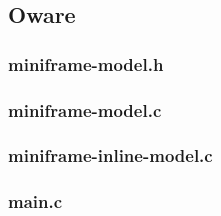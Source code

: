\begin{scriptsize}
\begin{ttfamily}

\end{ttfamily}
\end{scriptsize}

\subsection{Oware}

\subsubsection{miniframe-model.h}

\begin{scriptsize}
\begin{ttfamily}

\end{ttfamily}
\end{scriptsize}

\subsubsection{miniframe-model.c}

\begin{scriptsize}
\begin{ttfamily}

\end{ttfamily}
\end{scriptsize}

\subsubsection{miniframe-inline-model.c}

\begin{scriptsize}
\begin{ttfamily}

\end{ttfamily}
\end{scriptsize}

\subsubsection{main.c}

\begin{scriptsize}
\begin{ttfamily}

\end{ttfamily}
\end{scriptsize}

